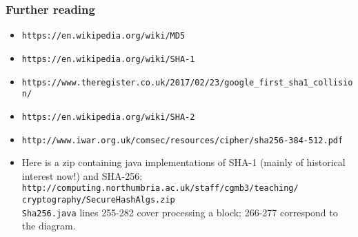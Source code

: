 \documentclass[10pt, hyperref={pdfpagelabels=false}]{beamer}
\begin{document}
\begin{frame}
\frametitle{Further reading}
\begin{itemize}
\item \texttt{\small\color{blue}https://en.wikipedia.org/wiki/MD5}
\item \texttt{\small\color{blue}https://en.wikipedia.org/wiki/SHA-1}
\item \texttt{\footnotesize https://www.theregister.co.uk/2017/02/23/google\_first\_sha1\_collision/}
\item \texttt{\small\color{blue}https://en.wikipedia.org/wiki/SHA-2}
\item \texttt{\footnotesize http://www.iwar.org.uk/comsec/resources/cipher/sha256-384-512.pdf}
\item Here is a zip containing java implementations of SHA-1 (mainly of historical interest now!) and SHA-256:\\
 \texttt{\small\color{blue}http://computing.northumbria.ac.uk/staff/cgmb3/teaching/\\cryptography/SecureHashAlgs.zip}\\
\texttt{Sha256.java} lines 255-282 cover processing a block; 266-277 correspond to the diagram.
\end{itemize}
\end{frame}
\end{document}
